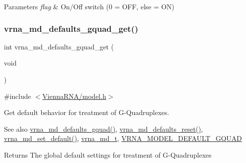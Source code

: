 \begin{DoxyParams}{Parameters}
{\em flag} & On/\+Off switch (0 = O\+FF, else = ON) \\
\hline
\end{DoxyParams}
\mbox{\label{group__model__details_gae645b8612f879eb38b45244fa9eddb9e}} 
\subsubsection{\texorpdfstring{vrna\+\_\+md\+\_\+defaults\+\_\+gquad\+\_\+get()}{vrna\_md\_defaults\_gquad\_get()}}
{\footnotesize\ttfamily int vrna\+\_\+md\+\_\+defaults\+\_\+gquad\+\_\+get (\begin{DoxyParamCaption}\item[{void}]{ }\end{DoxyParamCaption})}



{\ttfamily \#include $<$\hyperlink{model_8h}{Vienna\+R\+N\+A/model.\+h}$>$}



Get default behavior for treatment of G-\/\+Quadruplexes. 

\begin{DoxySeeAlso}{See also}
\hyperlink{group__model__details_ga0685ca2aeb39af76f2421fc308163dce}{vrna\+\_\+md\+\_\+defaults\+\_\+gquad()}, \hyperlink{group__model__details_ga70834424cf804d149937de89f80ceb45}{vrna\+\_\+md\+\_\+defaults\+\_\+reset()}, \hyperlink{group__model__details_ga8ac6ff84936282436f822644bf841f66}{vrna\+\_\+md\+\_\+set\+\_\+default()}, \hyperlink{group__model__details_ga1f8a10e12a0a1915f2a4eff0b28ea17c}{vrna\+\_\+md\+\_\+t}, \hyperlink{group__model__details_ga793ed812e86f43799b14b2deee917f23}{V\+R\+N\+A\+\_\+\+M\+O\+D\+E\+L\+\_\+\+D\+E\+F\+A\+U\+L\+T\+\_\+\+G\+Q\+U\+AD} 
\end{DoxySeeAlso}
\begin{DoxyReturn}{Returns}
The global default settings for treatment of G-\/\+Quadruplexes 
\end{DoxyReturn}
\mbox{\label{group__model__details_ga59b944f61c5d2babec2d4c48c820de67}} 
